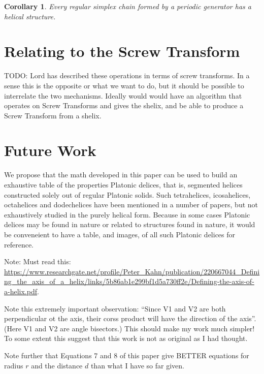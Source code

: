 \documentclass[11pt]{article}
\newtheorem{corollary}{Corollary}
\begin{document}
{\begin{corollary}
  Every regular simplex chain formed by a periodic generator has a helical structure.
  \end{corollary}

\section{Relating to the Screw Transform}

TODO: Lord has described these operations in terms of screw transforms. In a sense this is the opposite or what we want to do, but it should be possible to interrelate
the two mechanisms. Ideally would would have an algorithm that operates on Screw Transforms and gives the shelix, and be able to produce a Screw Transform
from a shelix.

\section{Future Work}

We propose that the math developed in this paper can be used to build an exhaustive table of the properties {Platonic delices},
that is, segmented helices constructed solely out of regular Platonic solids. Such tetrahelices, icosahelices, octahelices and dodechelices
have been mentioned in a number of papers\cite{elgersma2016quadrahelix,babiker2012combinatorial,lord2001sphere}, but not exhaustively studied in the purely helical form. Because in some cases Platonic delices may be found in nature or related to structures found in nature\cite{lord2004gamma},
it would be conveneient to have a table, and images, of all such Platonic delices for reference.



Note: Must read this: \url{https://www.researchgate.net/profile/Peter_Kahn/publication/220667044_Defining_the_axis_of_a_helix/links/5b86ab1e299bf1d5a730ff2e/Defining-the-axis-of-a-helix.pdf}\cite{kahn1989defining}.

Note this extremely important observation: ``Since V1 and V2 are both perpendicular ot the axis, their corss product will have the direction of the axis''. (Here V1 and V2 are angle bisectors.) This should make my work much simpler!  To some extent this suggest that this work is not as original as I had thought.

Note further that Equations 7 and 8 of this paper give BETTER equations for radius $r$ and the distance $d$ than what I have so far given.


}
\end{document}
